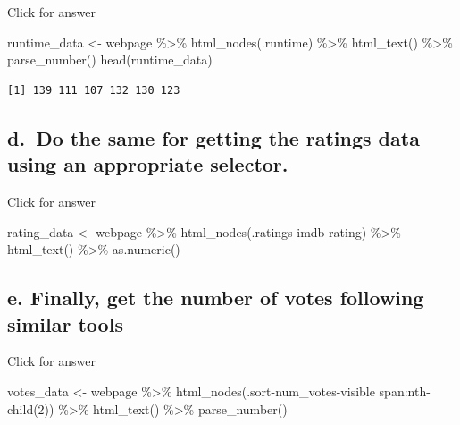 \documentclass[
]{book}
\newenvironment{Shaded}{\begin{snugshade}}{\end{snugshade}}
\newcommand{\FunctionTok}[1]{\textcolor[rgb]{0.00,0.00,0.00}{#1}}
\newcommand{\NormalTok}[1]{#1}
\newcommand{\OtherTok}[1]{\textcolor[rgb]{0.56,0.35,0.01}{#1}}
\newcommand{\SpecialCharTok}[1]{\textcolor[rgb]{0.00,0.00,0.00}{#1}}
\newcommand{\StringTok}[1]{\textcolor[rgb]{0.31,0.60,0.02}{#1}}
\begin{document}
Click for answer

\begin{Shaded}
\begin{Highlighting}[]
\NormalTok{runtime\_data }\OtherTok{\textless{}{-}}\NormalTok{ webpage }\SpecialCharTok{\%\textgreater{}\%} 
  \FunctionTok{html\_nodes}\NormalTok{(}\StringTok{\textquotesingle{}.runtime\textquotesingle{}}\NormalTok{) }\SpecialCharTok{\%\textgreater{}\%} 
  \FunctionTok{html\_text}\NormalTok{() }\SpecialCharTok{\%\textgreater{}\%} 
  \FunctionTok{parse\_number}\NormalTok{()}
\FunctionTok{head}\NormalTok{(runtime\_data)}
\end{Highlighting}
\end{Shaded}

\begin{verbatim}
[1] 139 111 107 132 130 123
\end{verbatim}

\hypertarget{d.-do-the-same-for-getting-the-ratings-data-using-an-appropriate-selector.}{%
\subsection{d.~Do the same for getting the ratings data using an appropriate selector.}\label{d.-do-the-same-for-getting-the-ratings-data-using-an-appropriate-selector.}}

Click for answer

\begin{Shaded}
\begin{Highlighting}[]
\NormalTok{rating\_data }\OtherTok{\textless{}{-}}\NormalTok{ webpage }\SpecialCharTok{\%\textgreater{}\%} 
  \FunctionTok{html\_nodes}\NormalTok{(}\StringTok{\textquotesingle{}.ratings{-}imdb{-}rating\textquotesingle{}}\NormalTok{) }\SpecialCharTok{\%\textgreater{}\%} 
  \FunctionTok{html\_text}\NormalTok{() }\SpecialCharTok{\%\textgreater{}\%} 
  \FunctionTok{as.numeric}\NormalTok{()}
\end{Highlighting}
\end{Shaded}

\hypertarget{e.-finally-get-the-number-of-votes-following-similar-tools}{%
\subsection{e. Finally, get the number of votes following similar tools}\label{e.-finally-get-the-number-of-votes-following-similar-tools}}

Click for answer

\begin{Shaded}
\begin{Highlighting}[]
\NormalTok{votes\_data }\OtherTok{\textless{}{-}}\NormalTok{ webpage }\SpecialCharTok{\%\textgreater{}\%} 
  \FunctionTok{html\_nodes}\NormalTok{(}\StringTok{\textquotesingle{}.sort{-}num\_votes{-}visible span:nth{-}child(2)\textquotesingle{}}\NormalTok{) }\SpecialCharTok{\%\textgreater{}\%} 
  \FunctionTok{html\_text}\NormalTok{() }\SpecialCharTok{\%\textgreater{}\%} 
  \FunctionTok{parse\_number}\NormalTok{()}
\end{Highlighting}
\end{Shaded}
\end{document}
